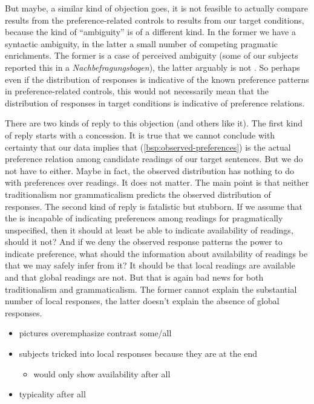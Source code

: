 \documentclass[fleqn,reqno,10pt,draft]{article}
\newcommand{\ivt}{\acro{ivt}}
\begin{document}
But maybe, a similar kind of objection goes, it is not feasible to
actually compare results from the preference-related controls to
results from our target conditions, because the kind of ``ambiguity''
is of a different kind. In the former we have a syntactic
ambiguity, in the latter a small number of competing pragmatic
enrichments. The former is a case of perceived ambiguity (some of our
subjects reported this in a \emph{Nachbefragungsbogen}), 
the latter arguably is
not \citep[c.f.][]{GeurtsPouscoulous2009:Embedded-Implic}. So perhaps
even if the distribution of responses is indicative of the known
preference patterns in preference-related controls, this would not
necessarily mean that the distribution of responses in target
conditions is indicative of preference relations.

There are two kinds of reply to this objection (and others like
it). The first kind of reply starts with a concession. It is true that
we cannot conclude with certainty that our data implies that
(\ref{bsp:observed-preferences}) is the actual preference relation
among candidate readings of our target sentences. But we do not have
to either. Maybe in fact, the observed distribution has nothing to do
with preferences over readings. It does not matter. The main point is
that neither traditionalism nor grammaticalism predicts the observed
distribution of responses. The second kind of reply is fatalistic but
stubborn. If we assume that the \ivt is incapable of indicating
preferences among readings for pragmatically unspecified, then it
should at least be able to indicate availability of readings, should
it not? And if we deny the observed response patterns the power to
indicate preference, what should the information about availability of
readings be that we may safely infer from it? It should be that local
readings are available and that global readings are not. But that is
again bad news for both traditionalism and grammaticalism. The former
cannot explain the substantial number of local responses, the latter
doesn't explain the absence of global responses.



\begin{itemize}
\item pictures overemphasize contrast some/all
\item subjects tricked into local responses because they are at the end
  \begin{itemize}
  \item would only show availability after all
  \end{itemize}
\item typicality after all
\end{itemize}
\end{document}
